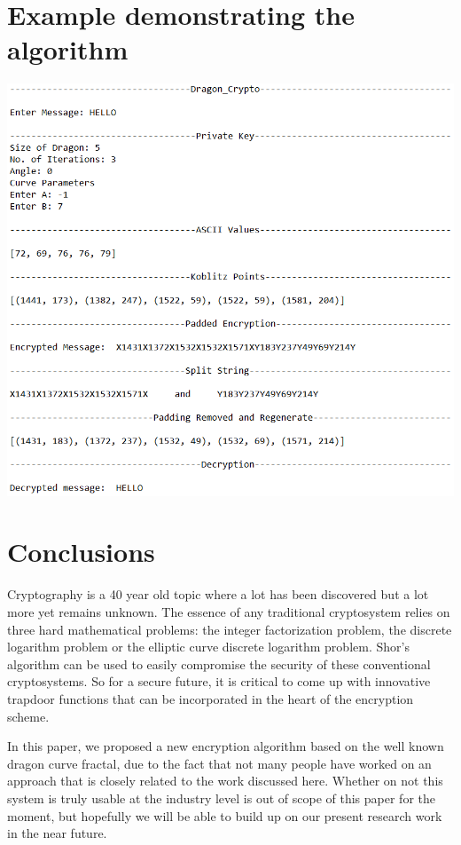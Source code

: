 \documentclass[cryptography,article,submit,moreauthors,pdftex]{Definitions/mdpi}
\begin{document}
\section{Example demonstrating the algorithm}
\begin{center}
    \includegraphics[scale=0.77]{images/output.png}
\end{center}

\section{Conclusions}
\begin{flushleft}
    Cryptography is a 40 year old topic where a lot has been discovered but a lot more yet remains unknown. The essence of any traditional cryptosystem relies on three hard mathematical problems: the integer factorization problem, the discrete logarithm problem or the elliptic curve discrete logarithm problem. Shor's algorithm can be used to easily compromise the security of these conventional cryptosystems. So for a secure future, it is critical to come up with innovative trapdoor functions that can be incorporated in the heart of the encryption scheme.
\end{flushleft}

\begin{flushleft}
   In this paper, we proposed a new encryption algorithm based on the well known dragon curve fractal, due to the fact that not many people have worked on an approach that is closely related to the work discussed here. Whether on not this system is truly usable at the industry level is out of scope of this paper for the moment, but hopefully we will be able to build up on our present research work in the near future. 
\end{flushleft}
\end{document}

